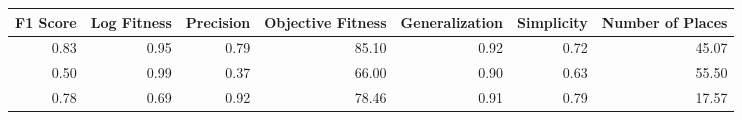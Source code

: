 \begin{tabular}{rrrrrrr}
\toprule
F1 Score & Log Fitness & Precision & Objective Fitness & Generalization & Simplicity & Number of Places \\
\midrule
0.83 & 0.95 & 0.79 & 85.10 & 0.92 & 0.72 & 45.07 \\
0.50 & 0.99 & 0.37 & 66.00 & 0.90 & 0.63 & 55.50 \\
0.78 & 0.69 & 0.92 & 78.46 & 0.91 & 0.79 & 17.57 \\
\bottomrule
\end{tabular}
